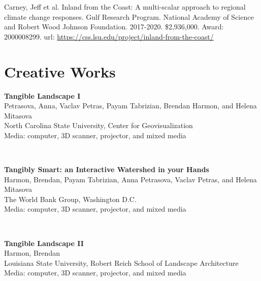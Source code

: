 \documentclass[]{baharmon_cv}
\begin{document}
Carney, Jeff et al. Inland from the Coast: A multi-scalar approach to regional climate change responses. Gulf Research Program. National Academy of Science and Robert Wood Johnson Foundation. 2017-2020. \$2,936,000. Award: 2000008299.
url: \url{https://css.lsu.edu/project/inland-from-the-coast/}\\



\section{Creative Works} 
\vspace*{1em}

\begin{minipage}[t]{0.85\textwidth}
\textbf{Tangible Landscape I}\\
Petrasova, Anna, Vaclav Petras, Payam Tabrizian, Brendan Harmon, and Helena Mitasova\\
North Carolina State University, Center for Geovisualization\\
Media: computer, 3D scanner, projector, and mixed media\\
\end{minipage}
\begin{minipage}[t]{0.15\textwidth} 
\end{minipage}\\

\begin{minipage}[t]{0.85\textwidth}
\textbf{Tangibly Smart: an Interactive Watershed in your Hands}\\
Harmon, Brendan, Payam Tabrizian, Anna Petrasova, Vaclav Petras, and Helena Mitasova\\
The World Bank Group, Washington D.C.\\
Media: computer, 3D scanner, projector, and mixed media\\
\end{minipage}
\begin{minipage}[t]{0.15\textwidth} 
\end{minipage}\\

\begin{minipage}[t]{0.85\textwidth}
\textbf{Tangible Landscape II }\\
Harmon, Brendan\\
Louisiana State University, Robert Reich School of Landscape Architecture\\
Media: computer, 3D scanner, projector, and mixed media\\
\end{minipage}
\begin{minipage}[t]{0.15\textwidth} 
\end{minipage}\\
\end{document}
